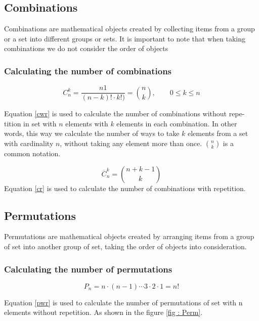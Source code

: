 \documentclass[11pt,a4paper]{article}
\begin{document}
	\subsection{Combinations}
	Combinations are mathematical objects created by collecting items from a
	group or a set into different groups or sets. It is important to note that
	when taking combinations we do not consider the order of objects
	
	\subsubsection{Calculating the number of combinations}
	\begin{equation} \label{cwr}
	C_n^k=\frac{n1}{(n-k)! \cdot k!)}={n\choose k}, \qquad 0\le k\le n
	\end{equation}

	Equation \eqref{cwr} is used to calculate the number of combinations without repe-
	tition in set with $n$ elements with $k$ elements in each combination. In other words, this way we calculate the number of ways to take $k$ elements from a set with cardinality $n$, without taking any element more than once. ${n \choose k}$ is a common notation.
	
	\begin{equation} \label{cr}
	\overline C_n^k={n+k-1\choose k}
	\end{equation}
	Equation \eqref{cr} is used to calculate the number of combinations with repetition.
	
	\subsection{Permutations}
	Permutations are mathematical objects created by arranging items from
	a group of set into another group of set, taking the order of objects into
	consideration.
	
	\subsubsection{Calculating the number of permutations}
	\begin{equation}\label{pwr}
	P_n=n\cdot\left(n-1\right)\cdots 3\cdot 2\cdot 1=n!
	\end{equation}
	
	Equation \eqref{pwr} is used to calculate the number of permutations of set with n
	elements without repetition. As shown in the figure \ref{fig : Perm}. \\ 
	
\end{document}

